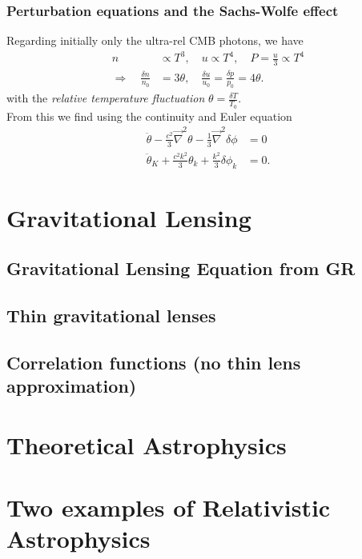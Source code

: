 \subsubsection{Perturbation equations and the Sachs-Wolfe effect}
Regarding initially only the ultra-rel CMB photons, we have
\begin{align}
	n &\propto T^3, \quad u \propto T^4, \quad P=\frac{u}{3} \propto T^4 \\
	\Rightarrow \quad \frac{\delta n}{n_0}& = 3 \theta,\quad \frac{\delta u}{u_0} = \frac{\delta p}{p_0} = 4\theta.
\end{align}
with the \emph{relative temperature fluctuation} $\theta=\frac{\delta T}{T_0}$.\\
From this we find using the continuity and Euler equation
\begin{align}
\ddot{\theta} -\frac{c^2}{3} \vec{\nabla}^2 \theta - \frac{1}{3} \vec{\nabla}^2\delta \phi &=0 \\
\ddot{\theta}_K + \frac{c^2 k^2}{3} \theta_k + \frac{k^2}{3} \delta \phi_k &=0.
\end{align}






\section{Gravitational Lensing}
\subsection{Gravitational Lensing Equation from GR}
\subsection{Thin gravitational lenses}
\subsection{Correlation functions (no thin lens approximation)}
\section{Theoretical Astrophysics}








\newpage
\section{Two examples of Relativistic Astrophysics}
